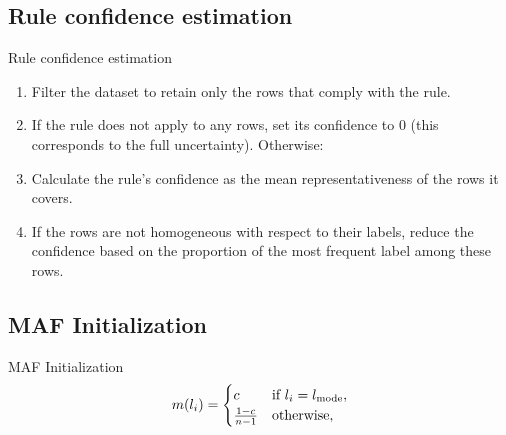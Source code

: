 \documentclass[aspectratio=169]{beamer}
\begin{document}
\subsection{Rule confidence estimation}
\begin{frame}{Rule confidence estimation}

\begin{enumerate}
    \item Filter the dataset to retain only the rows that comply with the rule. \pause
    \item If the rule does not apply to any rows, set its confidence to 0 (this corresponds
to the full uncertainty). Otherwise: \pause
    \item Calculate the rule's confidence as the mean representativeness of the rows it
covers. \pause
    \item If the rows are not homogeneous with respect to their labels, reduce the
confidence based on the proportion of the most frequent label among these
rows.
\end{enumerate} 
\end{frame}




\subsection{MAF Initialization}
\begin{frame}{MAF Initialization}
\[
m(l_i) = 
\begin{cases} 
c & \text{if } l_i = l_{\text{{\rm mode}}}, \\
\frac{1-c}{n-1} & \text{otherwise},
\end{cases}
\]


\end{frame}
\end{document}
